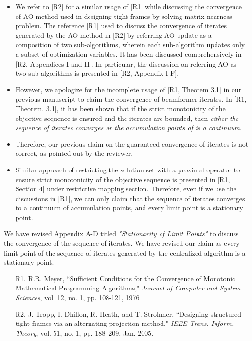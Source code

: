 \begin{enumerate}
	\begin{itemize}
		\item We refer to [R2] for a similar usage of [R1] while discussing the convergence of \ac{AO} method used in designing tight frames by solving matrix nearness problem. The reference [R1] used to discuss the convergence of iterates generated by the \ac{AO} method in [R2] by referring \ac{AO} update as a composition of two sub-algorithms, wherein each sub-algorithm updates only a subset of optimization variables. It has been discussed comprehensively in [R2, Appendices I and II]. In particular, the discussion on referring \ac{AO} as two sub-algorithms is presented in [R2, Appendix I-F].
		\item However, we apologize for the incomplete usage of [R1, Theorem 3.1] in our previous manuscript to claim the convergence of beamformer iterates. In [R1, Theorem. 3.1], it has been shown that if the strict monotonicity of the objective sequence is ensured and the iterates are bounded, then \textit{either the sequence of iterates converges or the accumulation points of  is a continuum}.
		\item Therefore, our previous claim on the guaranteed convergence of iterates is not correct, as pointed out by the reviewer. 
		\item Similar approach of restricting the solution set with a proximal operator to ensure strict monotonicity of the objective sequence is presented in [R1, Section 4] under restrictive mapping section. Therefore, even if we use the discussions in [R1], we can only claim that the sequence of iterates  converges to a continuum of accumulation points, and every limit point is a stationary point.
	\end{itemize}
	
	We have revised Appendix A-D titled \textit{"Stationarity of Limit Points"} to discuss the convergence of the sequence of iterates. We have revised our claim as every limit point of the sequence of iterates generated by the centralized algorithm is a stationary point.
	
	\vspace{1eM}
	\begin{itemize}		
		\item[R1.] R.R. Meyer, ``Sufficient Conditions for the Convergence of Monotonic Mathematical Programming Algorithms," \emph{Journal of Computer and System Sciences}, vol. 12, no. 1, pp. 108-121, 1976
		\item[R2.] J. Tropp, I. Dhillon, R. Heath, and T. Strohmer, ``Designing structured tight frames via an alternating projection method," \emph{IEEE Trans. Inform. Theory}, vol. 51, no. 1, pp. 188–209, Jan. 2005.
	\end{itemize}
	
\end{enumerate}
